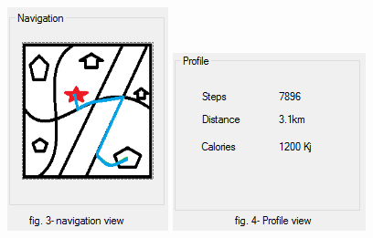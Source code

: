 \documentclass[a4paper,12pt]{article}
\begin{document}
\includegraphics[width=\textwidth]{images/user_three.PNG}
\includegraphics[width=\textwidth]{images/user_four.PNG}
\end{document}

